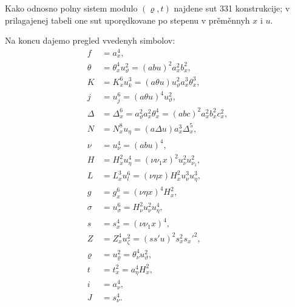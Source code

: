 \documentclass[11pt]{article}
\begin{document}
Kako odnosno polny sistem modulo $(\varrho,t)$ najdene sut 331 konstrukcije; v prilagajenej tabeli one sut uporędkovane po stepenu v prěměnnyh $x$ i $u$.

Na koncu dajemo pregled vvedenyh simbolov:
\begin{align*}
f&=a_x^4,\\
\theta&=\theta_x^4u_\vartheta^2=(abu)^2a_x^2b_x^2,\\
K&=K_x^6u_k^3=(a\theta u)u_\vartheta^2a_x^3\theta_x^3,\\
j&=u_j^6=(a\theta u)^4u_\vartheta^2,\\
\Delta&=\Delta_x^6=a_\vartheta^2a_x^2\theta_x^4=(abc)^2a_x^2b_x^2c_x^2,\\
N&=N_x^8u_\eta=(a\Delta u)a_x^3\Delta_x^5,\\
\nu&=u_\nu^4=(abu)^4,\\
H&=H_x^2u_\eta^4=(\nu\nu_1x)^2u_\nu^2u_{\nu_1}^2,\\
L&=L_x^3u_l^6=(\nu\eta x)H_x^2u_\nu^3u_\eta^3,\\
g&=g_x^6=(\nu\eta x)^4H_x^2,\\
\sigma&=u_\sigma^6=H_\nu^2u_\nu^2u_\eta^4,\\
s&=s_x^4=(\nu\nu_1x)^4,\\
Z&=Z_x^4u_\zeta^2=(ss'u)^2s_x^2s_x'^2,\\
\varrho&=u_\varrho^2=\theta_\nu^4u_\vartheta^2,\\
t&=t_x^2=a_\eta^4H_x^2,\\
i&=a_\nu^4,\\
J&=s_\nu^4.
\end{align*}
\end{document}
